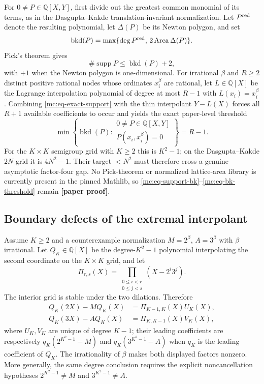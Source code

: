 \documentclass[11pt,oneside]{article}
\theoremstyle{definition}
\theoremstyle{remark}
\newcommand{\Q}{\mathbb Q}
\newcommand{\statusnew}{\textcolor{newgreen}{\textbf{[paper proof]}}}
\begin{document}
For $0\ne P\in\Q[X,Y]$, first divide out the greatest common monomial of its terms, as in the
Dasgupta--Kakde translation-invariant normalization.  Let $P^{\rm red}$ denote the resulting
polynomial, let $\Delta(P)$ be its Newton polygon, and set
\[
  \operatorname{bkd}(P)
   =\max\{\deg P^{\rm red},\,2\operatorname{Area}\Delta(P)\}.
\]
Pick's theorem gives
\begin{equation}
  \#\operatorname{supp}P\le \operatorname{bkd}(P)+2,
  \label{mc:eq-support-bk}
\end{equation}
with $+1$ when the Newton polygon is one-dimensional.  For irrational $\beta$ and $R\ge2$
distinct positive rational nodes whose ordinates $x_i^\beta$ are rational, let
$L\in\Q[X]$ be the Lagrange interpolation
polynomial of degree at most $R-1$ with $L(x_i)=x_i^\beta$.  Combining
\eqref{mc:eq-exact-support} with the thin interpolant
$Y-L(X)$ forces all $R+1$ available coefficients to occur and yields the exact paper-level
threshold
\begin{equation}
 \min\left\{\operatorname{bkd}(P):
 \substack{0\ne P\in\Q[X,Y]\\P(x_i,x_i^\beta)=0}
 \right\}=R-1.
 \label{mc:eq-bk-threshold}
\end{equation}
For the $K\times K$ semigroup grid with $K\ge2$ this is $K^2-1$; on the
Dasgupta--Kakde $2N$ grid it is
$4N^2-1$.  Their target $<N^2$ must therefore cross a genuine asymptotic factor-four gap.
No Pick-theorem or normalized lattice-area library is currently present in the pinned
Mathlib, so \eqref{mc:eq-support-bk}--\eqref{mc:eq-bk-threshold} remain \statusnew.

\subsection{Boundary defects of the extremal interpolant}
\label{mc:boundary}

Assume $K\ge2$ and a counterexample normalization
$M=2^\beta$, $A=3^\beta$ with $\beta$ irrational.  Let $Q_K\in\Q[X]$ be the
degree-$K^2-1$ polynomial interpolating the second coordinate on the $K\times K$ grid, and let
\[
  \Pi_{r,s}(X)=\prod_{\substack{0\le i<r\\0\le j<s}}(X-2^i3^j).
\]
The interior grid is stable under the two dilations.  Therefore
\begin{align}
 Q_K(2X)-M Q_K(X)&=\Pi_{K-1,K}(X)U_K(X),\label{mc:eq-defect-two}\\
 Q_K(3X)-A Q_K(X)&=\Pi_{K,K-1}(X)V_K(X),\label{mc:eq-defect-three}
\end{align}
where $U_K,V_K$ are unique of degree $K-1$; their leading coefficients are respectively
$q_K(2^{K^2-1}-M)$ and $q_K(3^{K^2-1}-A)$ when $q_K$ is the leading coefficient of $Q_K$.
The irrationality of $\beta$ makes both displayed factors nonzero.  More generally, the same
degree conclusion requires the explicit noncancellation hypotheses
$2^{K^2-1}\ne M$ and $3^{K^2-1}\ne A$.
\end{document}
